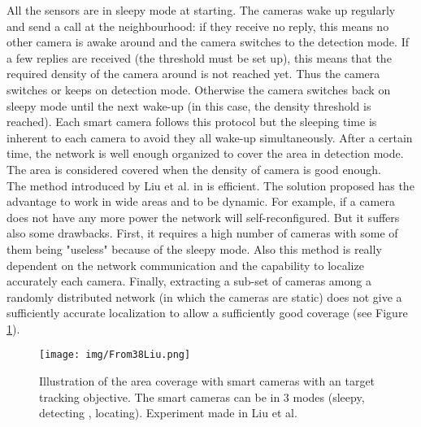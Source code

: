 All the sensors are in sleepy mode at starting. The cameras wake up regularly and send a call at the neighbourhood: if they receive no reply, this means no other camera is awake around and the camera switches to the detection mode. If a few replies are received (the threshold must be set up), this means that the required density of the camera around is not reached yet. Thus the camera switches or keeps on detection mode. Otherwise the camera switches back on sleepy mode until the next wake-up (in this case, the density threshold is reached). Each smart camera follows this protocol but the sleeping time is inherent to each camera to avoid they all wake-up simultaneously. After a certain time, the network is well enough organized to cover the area in detection mode. The area is considered covered when the density of camera is good enough. \\
 The method introduced by Liu et al. in \cite{38*liu2010} is efficient. The solution proposed has the advantage to work in wide areas and to be dynamic. For example, if a camera does not have any more power the network will self-reconfigured. But it suffers also some drawbacks. First, it requires a high number of cameras with some of them being "useless" because of the sleepy mode. Also this method is really dependent on the network communication and the capability to localize accurately each camera. Finally, extracting a sub-set of cameras among a randomly distributed network (in which the cameras are static) does not give a sufficiently accurate localization to allow a sufficiently good coverage (see Figure \ref{fig:Coverage38}). 
	\begin{figure}[t!]
	\center
{}
   \texttt{[image: img/From38Liu.png]}
  \caption{Illustration of  the  area coverage with smart cameras with an target tracking objective. The smart cameras can be in 3 modes (sleepy, detecting , locating). Experiment made in Liu et al. \citep{38*liu2010}}\label{fig:Coverage38}
  \endminipage\hfill
\end{figure} 


